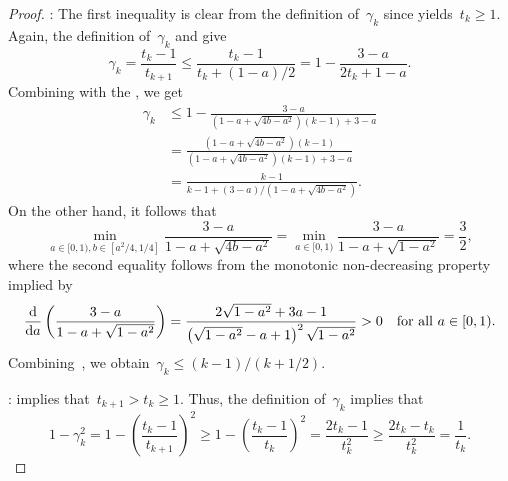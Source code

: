 \documentclass[../main]{subfiles}
\begin{document}
\begin{proof}
    :
    The first inequality is clear from the definition of~$\gamma_k$ since  yields~$t_k \ge 1$.
    Again, the definition of~$\gamma_k$ and  give
    \begin{equation}
        \gamma_k = \frac{t_k - 1}{t_{k + 1}} \le \frac{t_k - 1}{t_k + (1 - a) / 2} = 1 - \frac{3 - a}{2 t_k + 1 - a}
    .\end{equation} 
    Combining with the , we get
    \begin{equation} \label{eq:gamma}
        \begin{split}
            \gamma_k &\le 1 - \frac{3 - a}{\left(1 - a + \sqrt{4 b - a^2} \right)(k - 1) + 3 - a} \\
        &= \frac{\left( 1 - a + \sqrt{4 b - a^2} \right) (k - 1)}{\left(1 - a + \sqrt{4 b - a^2} \right)(k - 1) + 3 - a} \\
        &= \frac{k - 1}{k - 1 + (3 - a) / \left( 1 - a + \sqrt{4 b - a^2} \right)}
        .\end{split}
    \end{equation} 
    On the other hand, it follows that
    \begin{equation} \label{eq:min a b}
        \min_{a \in [0, 1), b \in [a^2 / 4, 1 / 4]} \frac{3 - a}{1 - a + \sqrt{4 b - a^2}} = \min_{a \in [0, 1)} \frac{3 - a}{1 - a + \sqrt{1 - a^2}} = \frac{3}{2}
    ,\end{equation}
    where the second equality follows from the monotonic non-decreasing property implied by
    \begin{equation}
        \odv*{\left(\frac{3 - a}{1 - a + \sqrt{1 - a^2}}\right)}{a} = \frac{2 \sqrt{1 - a^2} + 3a - 1}{\left( \sqrt{1 - a^2} - a + 1 \right)^2 \sqrt{1 - a^2}} > 0 \forallcondition{a \in [0, 1)}
    .\end{equation}  
    Combining~, we obtain~$\gamma_k \le (k - 1) / (k + 1 / 2)$.

    :
     implies that~$t_{k + 1} > t_k \ge 1$.
    Thus, the definition of~$\gamma_k$ implies that
    \begin{equation}
        1 - \gamma_k^2 = 1 - \left( \frac{t_k - 1}{t_{k + 1}} \right)^2 \ge 1 - \left( \frac{t_k - 1}{t_k} \right)^2
        = \frac{2 t_k - 1}{t_k^2} \ge \frac{2 t_k - t_k}{t_k^2} = \frac{1}{t_k}
    .\end{equation}
\end{proof}
\end{document}
